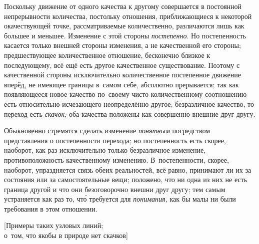 Поскольку движение от одного качества к другому совершается в постоянной
непрерывности количества, постольку отношения, приближающиеся к некоторой
окачествующей точке, рассматриваемые количественно, различаются лишь как
большее и меньшее. Изменение с этой стороны {\em постепенно}. Но постепенность
касается только внешней стороны изменения, а не качественной его стороны;
предшествующее количественное отношение, бесконечно близкое к последующему,
всё ещё есть другое качественное существование. Поэтому с качественной стороны
исключительно количественное постепенное движение вперёд, не имеющее границы
в~самом себе, абсолютно прерывается; так как появляющееся новое качество
по~своему чисто количественному соотношению есть относительно исчезающего
неопределённо другое, безразличное качество, то переход есть {\em скачок;}
оба качества положены как совершенно внешние друг другу.

Обыкновенно стремятся сделать изменение {\em понятным} посредством
представления о постепенности перехода; но постепенность есть скорее, наоборот,
как раз исключительно только безразличное изменение, противоположность
качественному изменению. В~постепенности, скорее, наоборот, упраздняется связь
обеих реальностей, всё равно, принимают ли их за состояния или за
самостоятельные вещи; положено, что ни одна из них не есть граница другой и что
они безоговорочно внешни друг другу; тем самым устраняется как раз то, чт\'{о}
требуется для {\em понимания,} как бы малы ни были требования в этом отношении.

%
{[Примеры таких узловых линий;\\о~том, что якобы в природе нет скачков]}

